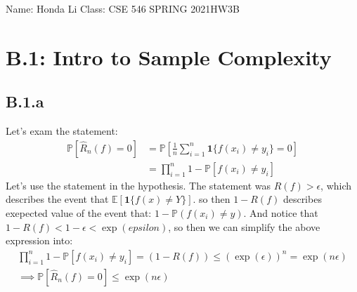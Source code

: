 \documentclass[]{article}
\begin{document}
\begin{center}
    Name: Honda Li \quad Class: CSE 546 SPRING 2021\quad HW3B 
\end{center}


\section*{B.1: Intro to Sample Complexity}
    \subsection*{B.1.a}
        Let's exam the statement: 
        \begin{align*}\tag{B.1.a}\label{eqn:B.1.a}
            \mathbb{P}\left[
                \hat{R}_n(f) = 0
            \right]
            &= 
            \mathbb{P}\left[
                \frac{1}{n}\sum_{i = 1}^{n}
                    \mathbf{1}\{
                        f(x_i) \ne y_i
                    \} = 0
            \right]
            \\
            &= 
            \prod_{i = 1}^{n}
                1 - \mathbb{P}\left[
                    f(x_i) \ne y_i
                \right]
        \end{align*}
    Let's use the statement in the hypothesis. The statement was $R(f) > \epsilon$, which describes the event that $\mathbb{E}\left[\mathbf{1}\{f(x)\ne Y\}\right]$. so then $1 - R(f)$ describes exepected value of the event that: $1 - \mathbb{P}\left(f(x_i) \ne y\right)$. And notice that $1 - R(f)< 1 - \epsilon < \exp(epsilon)$, so then we can simplify the above expression into: 
    \begin{align*}\tag{B.1.a.1}\label{eqn:B.1.a.1}
        \prod_{i = 1}^{n}
        1 - \mathbb{P}\left[
            f(x_i) \ne y_i
        \right] = (1 - R(f)) \le (\exp(\epsilon))^n = \exp(n\epsilon)
        \\
        \implies 
        \mathbb{P}\left[
            \hat{R}_n(f) = 0
        \right] \le \exp(n\epsilon)
    \end{align*}
\end{document}

